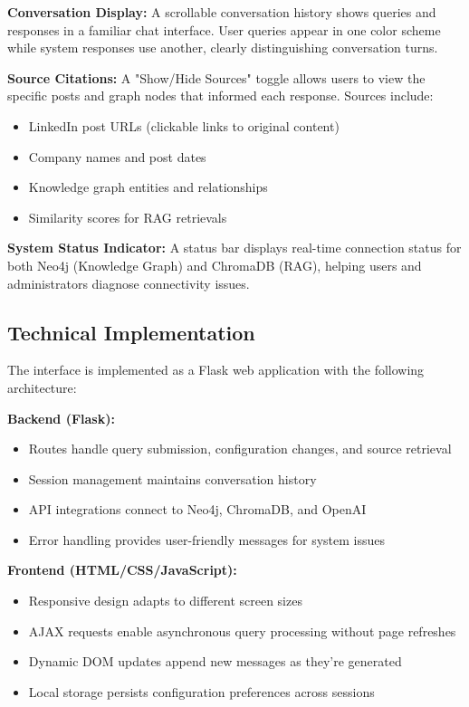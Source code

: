 \documentclass[11pt,twocolumn]{article}
\begin{document}
\textbf{Conversation Display:} A scrollable conversation history shows queries and responses in a familiar chat interface. User queries appear in one color scheme while system responses use another, clearly distinguishing conversation turns.

\textbf{Source Citations:} A "Show/Hide Sources" toggle allows users to view the specific posts and graph nodes that informed each response. Sources include:
\begin{itemize}
\item LinkedIn post URLs (clickable links to original content)
\item Company names and post dates
\item Knowledge graph entities and relationships
\item Similarity scores for RAG retrievals
\end{itemize}

\textbf{System Status Indicator:} A status bar displays real-time connection status for both Neo4j (Knowledge Graph) and ChromaDB (RAG), helping users and administrators diagnose connectivity issues.

\subsection{Technical Implementation}

The interface is implemented as a Flask web application with the following architecture:

\textbf{Backend (Flask):}
\begin{itemize}
\item Routes handle query submission, configuration changes, and source retrieval
\item Session management maintains conversation history
\item API integrations connect to Neo4j, ChromaDB, and OpenAI
\item Error handling provides user-friendly messages for system issues
\end{itemize}

\textbf{Frontend (HTML/CSS/JavaScript):}
\begin{itemize}
\item Responsive design adapts to different screen sizes
\item AJAX requests enable asynchronous query processing without page refreshes
\item Dynamic DOM updates append new messages as they're generated
\item Local storage persists configuration preferences across sessions
\end{itemize}
\end{document}
